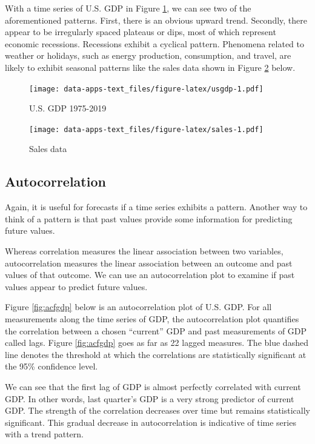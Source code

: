 \documentclass[
]{book}
\begin{document}
With a time series of U.S. GDP in Figure \ref{fig:usgdp}, we can see two of the aforementioned patterns. First, there is an obvious upward trend. Secondly, there appear to be irregularly spaced plateaus or dips, most of which represent economic recessions. Recessions exhibit a cyclical pattern. Phenomena related to weather or holidays, such as energy production, consumption, and travel, are likely to exhibit seasonal patterns like the sales data shown in Figure \ref{fig:sales} below.

\begin{figure}
\centering
\texttt{[image: data-apps-text\_files/figure-latex/usgdp-1.pdf]}
\caption{\label{fig:usgdp}U.S. GDP 1975-2019}
\end{figure}

\begin{figure}
\centering
\texttt{[image: data-apps-text\_files/figure-latex/sales-1.pdf]}
\caption{\label{fig:sales}Sales data}
\end{figure}

\hypertarget{autocorrelation}{%
\subsection{Autocorrelation}\label{autocorrelation}}

Again, it is useful for forecasts if a time series exhibits a pattern. Another way to think of a pattern is that past values provide some information for predicting future values.

Whereas correlation measures the linear association between two variables, autocorrelation measures the linear association between an outcome and past values of that outcome. We can use an autocorrelation plot to examine if past values appear to predict future values.

Figure \ref{fig:acfgdp} below is an autocorrelation plot of U.S. GDP. For all measurements along the time series of GDP, the autocorrelation plot quantifies the correlation between a chosen ``current'' GDP and past measurements of GDP called lags. Figure \ref{fig:acfgdp} goes as far as 22 lagged measures. The blue dashed line denotes the threshold at which the correlations are statistically significant at the 95\% confidence level.

We can see that the first lag of GDP is almost perfectly correlated with current GDP. In other words, last quarter's GDP is a very strong predictor of current GDP. The strength of the correlation decreases over time but remains statistically significant. This gradual decrease in autocorrelation is indicative of time series with a trend pattern.
\end{document}

